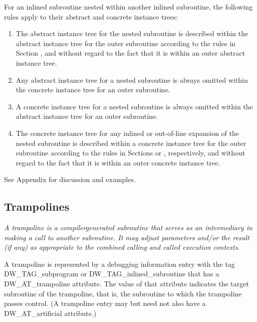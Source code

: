 For an inlined subroutine nested within another inlined
subroutine, the following rules apply to their abstract and
concrete instance trees:

\begin{enumerate}[1.]
\item The abstract instance tree for the nested subroutine is
described within the abstract instance tree for the outer
subroutine according to the rules in 
Section , and
without regard to the fact that it is within an outer abstract
instance tree.

\item Any abstract instance tree for a nested subroutine is
always omitted within the concrete instance tree for an
outer subroutine.

\item  A concrete instance tree for a nested subroutine is
always omitted within the abstract instance tree for an
outer subroutine.

\item The concrete instance tree for any inlined or out-of-line
expansion of the nested subroutine is described within a
concrete instance tree for the outer subroutine according
to the rules in 
Sections  or 
, respectively,
and without regard to the fact that it is within an outer
concrete instance tree.
\end{enumerate}

See Appendix  
for discussion and examples.

\subsection{Trampolines}
\label{chap:trampolines}

\textit{A trampoline is a compiler\dash generated subroutine that serves as
an intermediary in making a call to another subroutine. It may
adjust parameters and/or the result (if any) as appropriate
to the combined calling and called execution contexts.}

A trampoline is represented by a debugging information entry
with the tag DW\-\_TAG\-\_subprogram or DW\-\_TAG\-\_inlined\-\_subroutine
that has a DW\_AT\_trampoline attribute. The value of that
attribute indicates the target subroutine of the trampoline,
that is, the subroutine to which the trampoline passes
control. (A trampoline entry may but need not also have a
DW\_AT\_artificial attribute.)

